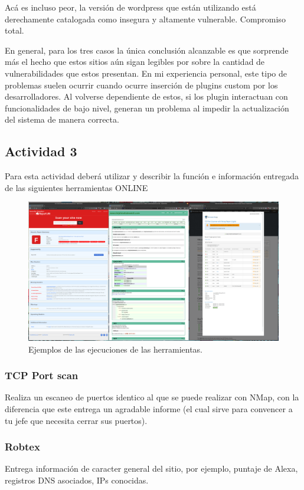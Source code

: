 \documentclass[11pt]{utalcaDoc}
\begin{document}
Acá es incluso peor, la versión de wordpress que están utilizando está derechamente catalogada como insegura y altamente vulnerable. Compromiso total.

En general, para los tres casos la única conclusión alcanzable es que sorprende más el hecho que estos sitios aún sigan legibles por sobre la cantidad de vulnerabilidades que estos presentan. En mi experiencia personal, este tipo de problemas suelen ocurrir cuando ocurre inserción de plugins custom por los desarrolladores. Al volverse dependiente de estos, si los plugin interactuan con funcionalidades de bajo nivel, generan un problema al impedir la actualización del sistema de manera correcta.



\subsection{Actividad 3}{Para esta actividad deberá utilizar y describir la función e información entregada de las siguientes herramientas ONLINE}


\begin{figure}[H]
	\centering
	\centering\includegraphics[width=.80\textwidth]{images/tooling.png}
\caption{Ejemplos de las ejecuciones de las herramientas.}
\label{FIG:tooling}
\end{figure}

\subsubsection{TCP Port scan}
Realiza un escaneo de puertos identico al que se puede realizar con NMap, con la diferencia que este entrega un agradable informe (el cual sirve para convencer a tu jefe que necesita cerrar sus puertos).

\subsubsection{Robtex}
Entrega información de caracter general del sitio, por ejemplo, puntaje de Alexa, registros DNS asociados, IPs conocidas.
\end{document}
